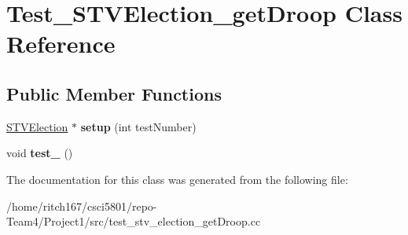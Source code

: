 \hypertarget{classTest__STVElection__getDroop}{}\section{Test\+\_\+\+S\+T\+V\+Election\+\_\+get\+Droop Class Reference}
\label{classTest__STVElection__getDroop}
\subsection*{Public Member Functions}
\begin{DoxyCompactItemize}
\item 
\mbox{\label{classTest__STVElection__getDroop_a80b93065ecd6584ef78f897ad7c30617}} 
\hyperlink{classSTVElection}{S\+T\+V\+Election} $\ast$ {\bfseries setup} (int test\+Number)
\item 
\mbox{\label{classTest__STVElection__getDroop_acf41aed8f99edd1c3bd3600cda261868}} 
void {\bfseries test\+\_} ()
\end{DoxyCompactItemize}


The documentation for this class was generated from the following file\+:\begin{DoxyCompactItemize}
\item 
/home/ritch167/csci5801/repo-\/\+Team4/\+Project1/src/test\+\_\+stv\+\_\+election\+\_\+get\+Droop.\+cc\end{DoxyCompactItemize}
